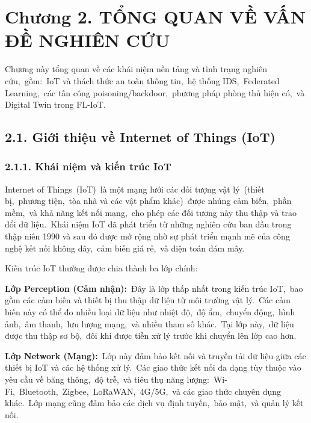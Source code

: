 \section{Chương 2. TỔNG QUAN VỀ VẤN ĐỀ NGHIÊN CỨU}\label{chux1b0ux1a1ng-2.-tux1ed5ng-quan-vux1ec1-vux1ea5n-ux111ux1ec1-nghiuxean-cux1ee9u}

Chương này tổng quan về các khái niệm nền tảng và tình trạng nghiên cứu,~gồm:~IoT và thách thức an toàn thông tin,~hệ thống IDS,~Federated Learning,~các tấn công poisoning/backdoor,~phương pháp phòng thủ hiện có,~và Digital Twin trong FL-IoT.

\subsection{2.1. Giới thiệu về Internet of Things (IoT)}\label{giux1edbi-thiux1ec7u-vux1ec1-internet-of-things-iot}

\subsubsection{2.1.1. Khái niệm và kiến trúc IoT}\label{khuxe1i-niux1ec7m-vuxe0-kiux1ebfn-truxfac-iot}

Internet of Things~(IoT)~là một mạng lưới các đối tượng vật lý~(thiết bị,~phương tiện,~tòa nhà và các vật phẩm khác)~được nhúng cảm biến,~phần mềm,~và khả năng kết nối mạng,~cho phép các đối tượng này thu thập và trao đổi dữ liệu.~Khái niệm IoT đã phát triển từ những nghiên cứu ban đầu trong thập niên 1990 và sau đó được mở rộng nhờ sự phát triển mạnh mẽ của công nghệ kết nối không dây,~cảm biến giá rẻ,~và điện toán đám mây.

Kiến trúc IoT thường được chia thành ba lớp chính:

\textbf{Lớp Perception (Cảm nhận):}~Đây là lớp thấp nhất trong kiến trúc IoT,~bao gồm các cảm biến và thiết bị thu thập dữ liệu từ môi trường vật lý.~Các cảm biến này có thể đo nhiều loại dữ liệu như nhiệt độ,~độ ẩm,~chuyển động,~hình ảnh,~âm thanh,~lưu lượng mạng,~và nhiều tham số khác.~Tại lớp này,~dữ liệu được thu thập sơ bộ,~đôi khi được tiền xử lý trước khi chuyển lên lớp cao hơn.

\textbf{Lớp Network (Mạng):}~Lớp này đảm bảo kết nối và truyền tải dữ liệu giữa các thiết bị IoT và các hệ thống xử lý.~Các giao thức kết nối đa dạng tùy thuộc vào yêu cầu về băng thông,~độ trễ,~và tiêu thụ năng lượng:~Wi-Fi,~Bluetooth,~Zigbee,~LoRaWAN,~4G/5G,~và các giao thức chuyên dụng khác.~Lớp mạng cũng đảm bảo các dịch vụ định tuyến,~bảo mật,~và quản lý kết nối.

